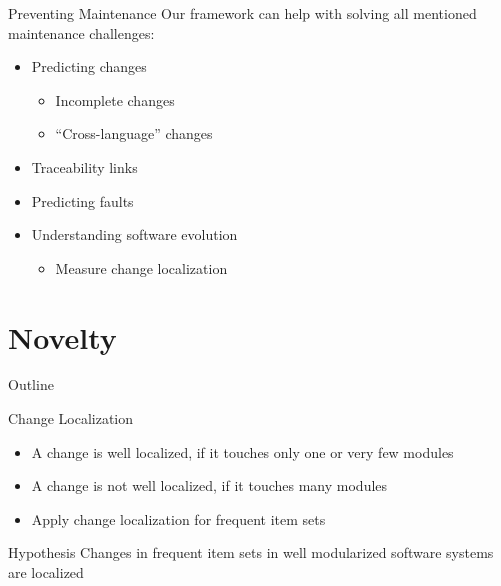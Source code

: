 \begin{frame}{Preventing Maintenance}
  Our framework can help with solving all mentioned maintenance
  challenges:

  \begin{itemize}
  \item Predicting changes
    \begin{itemize}
    \item Incomplete changes
    \item ``Cross-language'' changes
    \end{itemize}
  \item Traceability links
  \item Predicting faults
  \item Understanding software evolution
    \begin{itemize}
    \item Measure change localization
    \end{itemize}
  \end{itemize}
\end{frame}



\section{Novelty}

\begin{frame}{Outline}
  \tableofcontents[current]
\end{frame}

\note{
}

\begin{frame}{Change Localization}
  \begin{itemize}
  \item A change is well localized, if it touches only one or very few
    modules
  \item A change is not well localized, if it touches many modules
  \item Apply change localization for frequent item sets
  \end{itemize}


  \begin{block}{Hypothesis}
    Changes in frequent item sets in well modularized software systems
    are localized
  \end{block}
\end{frame}

